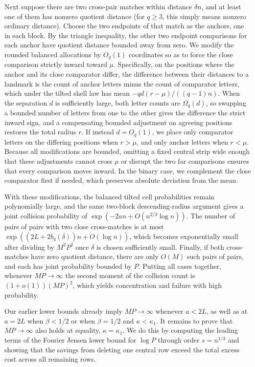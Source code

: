 Next suppose there are two cross-pair matches within distance \(\delta n\), and at least one of them has nonzero quotient distance (for \(q\ge3\), this simply means nonzero ordinary distance). Choose the two endpoints of that match as the anchors, one in each block. By the triangle inequality, the other two endpoint comparisons for each anchor have quotient distance bounded away from zero. We modify the rounded balanced allocations by \(O_q(1)\) coordinates so as to force the close comparison strictly inward toward \(\mu\). Specifically, on the positions where the anchor and its close comparator differ, the difference between their distances to a landmark is the count of anchor letters minus the count of comparator letters, which under the tilted shell law has mean \(-qd(r-\mu)/((q-1)n)\). When the separation \(d\) is sufficiently large, both letter counts are \(\Omega_q(d)\), so swapping a bounded number of letters from one to the other gives the difference the strict inward sign, and a compensating bounded adjustment on agreeing positions restores the total radius \(r\). If instead \(d=O_q(1)\), we place only comparator letters on the differing positions when \(r>\mu\), and only anchor letters when \(r<\mu\). Because all modifications are bounded, omitting a fixed central strip wide enough that these adjustments cannot cross \(\mu\) or disrupt the two far comparisons ensures that every comparison moves inward. In the binary case, we complement the close comparator first if needed, which preserves absolute deviation from the mean.

With these modifications, the balanced tilted cell probabilities remain polynomially large, and the same two-block descending-radius argument gives a joint collision probability of \(\exp(-2an+O(n^{2/3}\log n))\). The number of pairs of pairs with two close cross-matches is at most \(\exp((2L+2b_q(\delta))n+O(\log n))\), which becomes exponentially small after dividing by \(M^2P^2\) once \(\delta\) is chosen sufficiently small. Finally, if both cross-matches have zero quotient distance, there are only \(O(M)\) such pairs of pairs, and each has joint probability bounded by \(P\). Putting all cases together, whenever \(MP\to\infty\) the second moment of the collision count is \((1+o(1))(MP)^2\), which yields concentration and failure with high probability.

Our earlier lower bounds already imply \(MP\to\infty\) whenever \(a<2L\), as well as at \(a=2L\) when \(\beta<1/2\) or when \(\beta=1/2\) and \(\kappa<\kappa_1\). It remains to prove that \(MP\to\infty\) also holds at equality, \(\kappa=\kappa_1\). We do this by computing the leading terms of the Fourier Jensen lower bound for \(\log P\) through order \(s=n^{1/3}\) and showing that the savings from deleting one central row exceed the total excess cost across all remaining rows.

